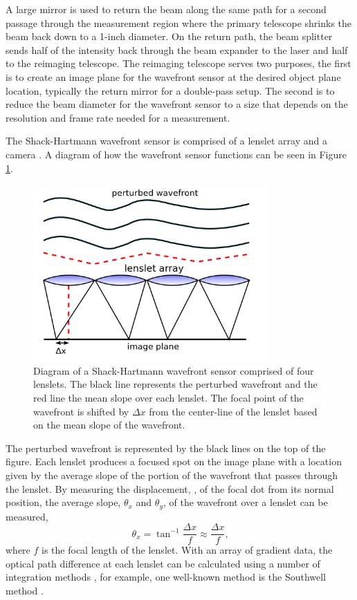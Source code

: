 A large mirror is used to return the beam along the same path for a second passage through the measurement region where the primary telescope shrinks the beam back down to a 1-inch diameter.
On the return path, the beam splitter sends half of the intensity back through the beam expander to the laser and half to the reimaging telescope.
The reimaging telescope serves two purposes, the first is to create an image plane for the wavefront sensor at the desired object plane location, typically the return mirror for a double-pass setup.
The second is to reduce the beam diameter for the wavefront sensor to a size that depends on the resolution and frame rate needed for a measurement.

The Shack-Hartmann wavefront sensor is comprised of a lenslet array and a camera \cite{Geary-1995-TQXWWFW2}.
A diagram of how the wavefront sensor functions can be seen in Figure \ref{fig:02_lenslet_array}.
\begin{figure}
  \centering
  \includegraphics[width=0.8\textwidth]{../other-sources/Shack_Hartmann_WFS_lensletarray.png}
  \caption{Diagram of a Shack-Hartmann wavefront sensor comprised of four lenslets. The black line represents the perturbed wavefront and the red line the mean slope over each lenslet. The focal point of the wavefront is shifted by $\Delta x$ from the center-line of the lenslet based on the mean slope of the wavefront. \cite{Shack-Hartman-Diagram-Wikipedia}}
  \label{fig:02_lenslet_array}
\end{figure}
The perturbed wavefront is represented by the black lines on the top of the figure.
Each lenslet produces a focused spot on the image plane with a location given by the average slope of the portion of the wavefront that passes through the lenslet.
By measuring the displacement, \cite{Nightingale-2013-gqr4p7GY}, of the focal dot from its normal position, the average slope, $\theta_x$ and $\theta_y$, of the wavefront over a lenslet can be measured,
\begin{equation}
  \theta_x = \tan^{-1}{\frac{\Delta x}{f}} \approx\frac{\Delta x}{f} \textrm{,}
\end{equation}
where $f$ is the focal length of the lenslet.
With an array of gradient data, the optical path difference at each lenslet can be calculated using a number of integration methods \cite{Huang-2015-W29DqPyp}, for example, one well-known method is the Southwell method \cite{Southwell-1980-KqUZMXRB}.

